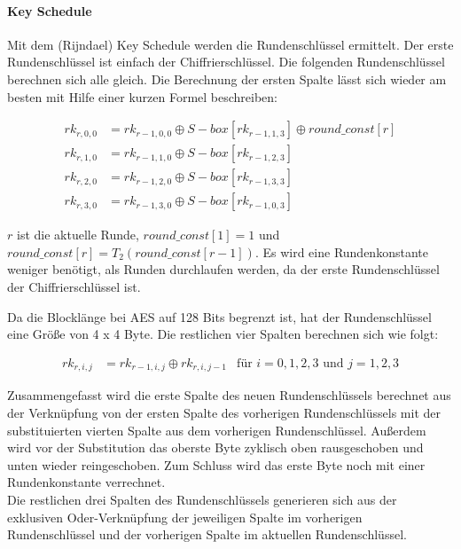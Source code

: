   \paragraph{Key Schedule}
   Mit dem (Rijndael) Key Schedule werden die Rundenschlüssel ermittelt. Der erste Rundenschlüssel ist
   einfach der Chiffrierschlüssel. Die folgenden Rundenschlüssel berechnen sich alle gleich. Die Berechnung der
   ersten Spalte lässt sich wieder am besten mit Hilfe einer kurzen Formel beschreiben:
   
    \begin{equation*}
     \begin{aligned}
     rk_{r,0,0} &= rk_{r-1,0,0} \oplus S-box[rk_{r-1,1,3}] \oplus round\_const[r] \\
     rk_{r,1,0} &= rk_{r-1,1,0} \oplus S-box[rk_{r-1,2,3}] \\
     rk_{r,2,0} &= rk_{r-1,2,0} \oplus S-box[rk_{r-1,3,3}] \\
     rk_{r,3,0} &= rk_{r-1,3,0} \oplus S-box[rk_{r-1,0,3}]
     \end{aligned}
    \end{equation*}
    
   $r$ ist die aktuelle Runde, $round\_const[1] = 1$ und $round\_const[r] = T_2(round\_const[r-1])$. Es wird eine
   Rundenkonstante weniger benötigt, als Runden durchlaufen werden, da der erste Rundenschlüssel der 
   Chiffrierschlüssel ist.
   
   Da die Blocklänge bei AES auf 128 Bits begrenzt ist, hat der Rundenschlüssel eine Größe von 4 x 4 Byte. Die
   restlichen vier Spalten berechnen sich wie folgt:
   
    \begin{equation*}
     \begin{aligned}
      rk_{r,i,j} &= rk_{r-1,i,j} \oplus rk_{r,i,j-1} &\text{für $i = 0, 1, 2, 3$ und $j = 1, 2, 3$}
     \end{aligned}
    \end{equation*}
    
   Zusammengefasst wird die erste Spalte des neuen Rundenschlüssels berechnet aus der Verknüpfung
   von der ersten Spalte des vorherigen Rundenschlüssels mit der substituierten vierten Spalte aus dem vorherigen
   Rundenschlüssel. Außerdem wird vor der Substitution das oberste Byte zyklisch oben rausgeschoben und unten
   wieder reingeschoben. Zum Schluss wird das erste Byte noch mit einer Rundenkonstante verrechnet. \\
   Die restlichen drei Spalten des Rundenschlüssels generieren sich aus der exklusiven Oder-Verknüpfung der
   jeweiligen Spalte im vorherigen Rundenschlüssel und der vorherigen Spalte im aktuellen Rundenschlüssel.

